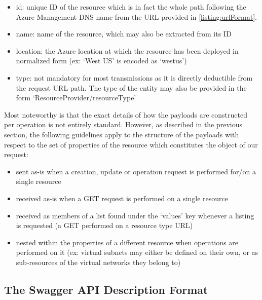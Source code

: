 \documentclass[11pt]{report}
\begin{document}
\begin{itemize}
    \item{id}: unique ID of the resource which is in fact the whole path
        following the Azure Management DNS name from the URL provided in
        \autoref{listing:urlFormat}.
    \item{name}: name of the resource, which may also be extracted from its ID
    \item{location}: the Azure location at which the resource has been
        deployed in normalized form (ex: `West US' is encoded as `westus')
    \item{type}: not mandatory for most transmissions as it is
        directly deductible from the request URL path. The type of the
        entity may also be provided in the form
        `ResourceProvider/resourceType'
\end{itemize}

Most noteworthy is that the exact details of how the payloads are constructed
per operation is not entirely standard. However, as described in the previous
section, the following guidelines apply to the structure of the payloads with
respect to the set of properties of the resource which constitutes the object
of our request:

\begin{itemize}
    \item{} sent as-is when a creation, update or operation request is
        performed for/on a single resource
    \item{} received as-is when a GET request is performed on a single
        resource
    \item{} received as members of a list found under the `values' key
        whenever a listing is requested (a GET performed on a resource type URL)
    \item{} nested within the properties of a different resource when
        operations are performed on it (ex: virtual subnets may either
        be defined on their own, or as sub-resources of the virtual networks
        they belong to)
\end{itemize}

\subsection{The Swagger API Description Format}
\end{document}
